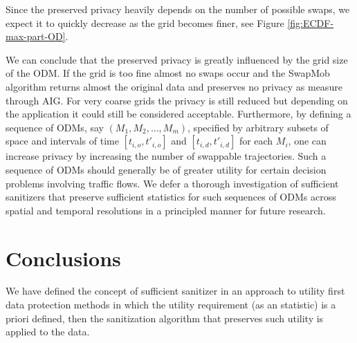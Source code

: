 \documentclass[times,twocolumn,final,authoryear]{elsarticle}
\begin{document}
Since the preserved privacy heavily depends on the number of possible
swaps, we expect it to quickly decrease as the grid becomes finer, see Figure
\ref{fig:ECDF-max-part-OD}. 

We can conclude that the preserved privacy is greatly influenced by
the grid size of the ODM. If the grid is too fine almost no swaps occur
and the SwapMob algorithm returns almost the original data and preserves no privacy as measure through AIG. For very coarse grids the privacy is still reduced but depending on the application it could still
be considered acceptable. 
Furthermore, by defining a sequence of ODMs, say $(M_1,M_2,\ldots,M_m)$, specified by arbitrary subsets of space 
and intervals of time $[t_{i,o},t'_{i,o}]$ and $[t_{i,d},t'_{i,d}]$ for each $M_i$, one can increase privacy by increasing the number of swappable trajectories. Such a sequence of ODMs should generally be of greater utility for certain decision problems involving traffic flows. We defer a thorough investigation of sufficient sanitizers that preserve sufficient statistics for such sequences of ODMs across spatial and temporal resolutions in a principled manner for future research.  

\section{Conclusions}\label{Sec:conclusions}

%

We have defined the concept of sufficient sanitizer in an approach to utility first data protection methods in which the utility requirement (as an statistic) is a priori defined, then the sanitization algorithm that preserves such utility is applied to the data.
\end{document}
